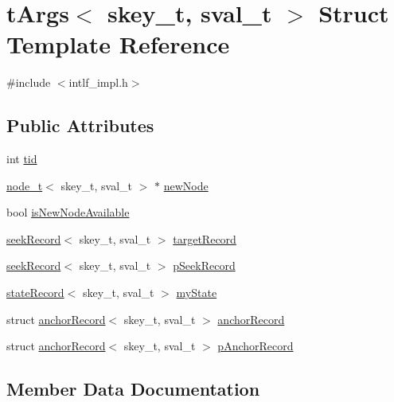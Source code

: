 \hypertarget{structtArgs}{}\section{t\+Args$<$ skey\+\_\+t, sval\+\_\+t $>$ Struct Template Reference}
\label{structtArgs}


{\ttfamily \#include $<$intlf\+\_\+impl.\+h$>$}

\subsection*{Public Attributes}
\begin{DoxyCompactItemize}
\item 
int \hyperlink{structtArgs_a320de799cc255dd57991133442937738}{tid}
\item 
\hyperlink{structnode__t}{node\+\_\+t}$<$ skey\+\_\+t, sval\+\_\+t $>$ $\ast$ \hyperlink{structtArgs_a7051ff5a92464af6e2dddd17d944d7da}{new\+Node}
\item 
bool \hyperlink{structtArgs_a0aa04a92450593265c01c6ecbb15ac59}{is\+New\+Node\+Available}
\item 
\hyperlink{structseekRecord}{seek\+Record}$<$ skey\+\_\+t, sval\+\_\+t $>$ \hyperlink{structtArgs_a8f559d067821fb34b64a5e734e0d6025}{target\+Record}
\item 
\hyperlink{structseekRecord}{seek\+Record}$<$ skey\+\_\+t, sval\+\_\+t $>$ \hyperlink{structtArgs_a2e843aefca73932645827aeb98a3f620}{p\+Seek\+Record}
\item 
\hyperlink{structstateRecord}{state\+Record}$<$ skey\+\_\+t, sval\+\_\+t $>$ \hyperlink{structtArgs_af2580d3ccc03992847f75b823502e0d0}{my\+State}
\item 
struct \hyperlink{structanchorRecord}{anchor\+Record}$<$ skey\+\_\+t, sval\+\_\+t $>$ \hyperlink{structtArgs_af74947cf54218b2404c50fcd5310bf0c}{anchor\+Record}
\item 
struct \hyperlink{structanchorRecord}{anchor\+Record}$<$ skey\+\_\+t, sval\+\_\+t $>$ \hyperlink{structtArgs_a6a8c3056aaae3f728b301bb0a859aa32}{p\+Anchor\+Record}
\end{DoxyCompactItemize}


\subsection{Member Data Documentation}
\mbox{\label{structtArgs_af74947cf54218b2404c50fcd5310bf0c}} 
